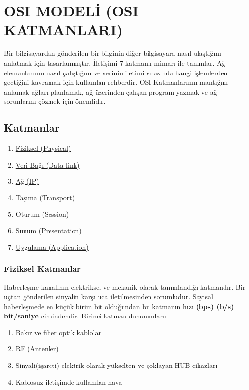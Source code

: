 \section{OSI MODELİ (OSI KATMANLARI)}
Bir bilgisayardan gönderilen bir bilginin diğer bilgisayara nasıl ulaştığını anlatmak için tasarlanmıştır.
İletişimi 7 katmanlı mimarı ile tanımlar.
Ağ elemanlarının nasıl çalıştığını ve verinin iletimi sırasında hangi işlemlerden gectiğini kavramak için kullanılan rehberdir.
OSI Katmanlarının mantığını anlamak ağları planlamak, ağ üzerinden çalışan program yazmak ve ağ sorunlarını çözmek için önemlidir.

\subsection{Katmanlar}
\begin{enumerate}
	\item \hyperref[subsubsec:fiziksel_katmanlar]{ Fiziksel (Physical)}
	\item \hyperref[subsubsec:veri_bagi_katmani]{Veri Bağı (Data link)}
	\item \hyperref[subsubsec:ag_katmani]{Ağ (IP)}
	\item \hyperref[subsubsec:tasima_katmani]{Taşıma (Transport)}
	\item Oturum (Session)
	\item Sunum (Presentation)
	\item \hyperref[subsubsec:tasima_katmani]{Uygulama (Application)}
\end{enumerate}

\subsubsection{Fiziksel Katmanlar}\label{subsubsec:fiziksel_katmanlar}
Haberleşme kanalının elektriksel ve mekanik olarak tanımlandığı katmandır.
Bir uçtan gönderilen sinyalin karşı uca iletilmesinden sorumludur.
Sayısal haberleşmede en küçük birim bit olduğundan bu katmanın hızı \textbf{(bps) (b/s) bit/saniye} cinsindendir.
Birinci katman donanımları:
\begin{enumerate}
	\item Bakır ve fiber optik kablolar
	\item RF (Antenler)
	\item Sinyali(işareti) elektrik olarak yükselten ve çoklayan HUB cihazları
	\item Kablosuz iletişimde kullanılan hava
\end{enumerate}

